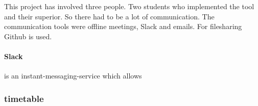 This project has involved three people. Two students who implemented the tool and their superior. So there had to be a lot of communication. The communication tools were offline meetings, Slack and emails. For filesharing Github is used. 
\paragraph*{Slack} is an instant-messaging-service which allows 

\subsubsection*{timetable}



